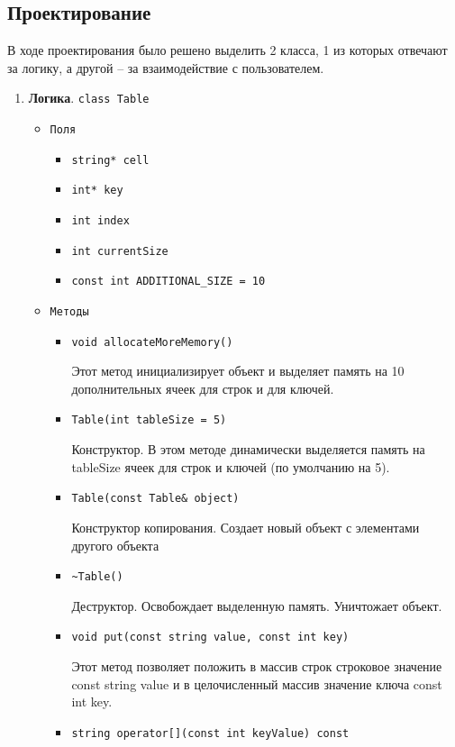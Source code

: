 \documentclass[12pt,a4paper]{report}
\begin{document}
\subsection{Проектирование}
\hspace{\parindent}
В ходе проектирования было решено выделить 2 класса, 1 из которых отвечают за логику, а другой -- за взаимодействие с пользователем.
\begin{enumerate}
\item \textbf{Логика}. \verb+class Table+
\hspace{\parindent}

\begin{itemize}

\item \verb+Поля+
\begin{itemize}
\item \verb+string* cell+
\item \verb+int* key+
\item \verb+int index+
\item \verb+int currentSize+
\item \verb+const int ADDITIONAL_SIZE = 10+
\end{itemize}
\item \verb+Методы+
\begin{itemize}
\item \verb+void allocateMoreMemory()+

Этот метод инициализирует объект и выделяет память на 10 дополнительных ячеек для строк и для ключей.
\item \verb+Table(int tableSize = 5)+

Конструктор. В этом методе динамически выделяется память на tableSize ячеек для строк и ключей (по умолчанию на 5).
\item \verb+Table(const Table& object)+

Конструктор копирования. Создает новый объект с элементами другого объекта
\item \verb+~Table()+

Деструктор. Освобождает выделенную память. Уничтожает объект.
\item \verb+void put(const string value, const int key)+

Этот метод позволяет положить в массив строк строковое значение const string value и в целочисленный массив значение ключа const int key.
\item \verb+string operator[](const int keyValue) const+


\end{itemize}
\end{itemize}
\end{enumerate}
\end{document}
